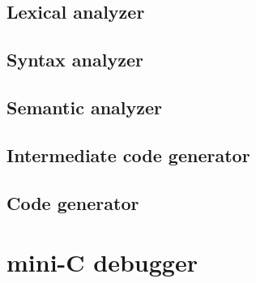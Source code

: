 \documentclass{article}
\begin{document}
	\subsection{Lexical analyzer}
	
	\subsection{Syntax analyzer}
	
	\subsection{Semantic analyzer}
	
	\subsection{Intermediate code generator}
	
	\subsection{Code generator}
	
	\section{mini-C debugger}
\end{document}
